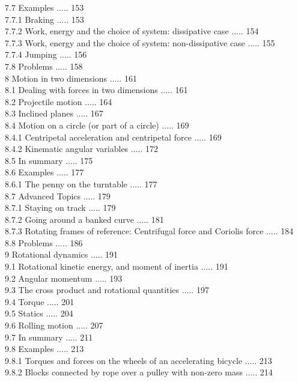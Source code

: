 \documentclass[10pt]{article}
\begin{document}
7.7 Examples ..... 153\\
7.7.1 Braking ..... 153\\
7.7.2 Work, energy and the choice of system: dissipative case ..... 154\\
7.7.3 Work, energy and the choice of system: non-dissipative case ..... 155\\
7.7.4 Jumping ..... 156\\
7.8 Problems ..... 158\\
8 Motion in two dimensions ..... 161\\
8.1 Dealing with forces in two dimensions ..... 161\\
8.2 Projectile motion ..... 164\\
8.3 Inclined planes ..... 167\\
8.4 Motion on a circle (or part of a circle) ..... 169\\
8.4.1 Centripetal acceleration and centripetal force ..... 169\\
8.4.2 Kinematic angular variables ..... 172\\
8.5 In summary ..... 175\\
8.6 Examples ..... 177\\
8.6.1 The penny on the turntable ..... 177\\
8.7 Advanced Topics ..... 179\\
8.7.1 Staying on track ..... 179\\
8.7.2 Going around a banked curve ..... 181\\
8.7.3 Rotating frames of reference: Centrifugal force and Coriolis force ..... 184\\
8.8 Problems ..... 186\\
9 Rotational dynamics ..... 191\\
9.1 Rotational kinetic energy, and moment of inertia ..... 191\\
9.2 Angular momentum ..... 193\\
9.3 The cross product and rotational quantities ..... 197\\
9.4 Torque ..... 201\\
9.5 Statics ..... 204\\
9.6 Rolling motion ..... 207\\
9.7 In summary ..... 211\\
9.8 Examples ..... 213\\
9.8.1 Torques and forces on the wheels of an accelerating bicycle ..... 213\\
9.8.2 Blocks connected by rope over a pulley with non-zero mass ..... 214\\
\end{document}

